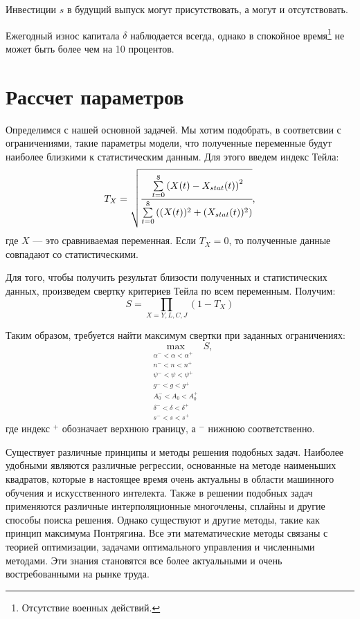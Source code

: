 Инвестиции $s$ в будущий выпуск могут присутствовать, а могут и отсутствовать.

Ежегодный износ капитала $\delta$ наблюдается всегда, однако в спокойное время\footnote{Отсутствие военных действий.} не может быть более чем на 10 процентов.

\section{Рассчет параметров}

Определимся с нашей основной задачей.
Мы хотим подобрать, в соответсвии с ограничениями, такие параметры модели, что полученные переменные будут наиболее близкими к статистическим данным.
Для этого введем индекс Тейла:
\begin{equation*}
	T_{X} = \sqrt{\cfrac{\sum\limits_{t = 0}^{8}\left(X(t) - X_{stat}(t)\right)^2}{\sum\limits_{t = 0}^{8}\left((X(t))^2 + (X_{stat}(t))^2\right)}}\text{,}
\end{equation*}
где $X$ --- это сравниваемая переменная.
Если $T_{X} = 0$, то полученные данные совпадают со статистическими.

Для того, чтобы получить результат близости полученных и статистических данных, произведем свертку критериев Тейла по всем переменным.
Получим:
\begin{equation*}
S=\prod\limits_{X=Y,L,C,J}\left(1 -T_{X}\right)
\end{equation*}

Таким образом, требуется найти максимум свертки при заданных ограничениях:
\begin{equation*}
\max_{\substack{\alpha^- < \alpha < \alpha^+ \\ n^- < n < n^+ \\ \psi^- < \psi < \psi^+ \\ g^- < g < g^+ \\ A_0^- < A_0 < A_0^+ \\ \delta^- < \delta < \delta^+\\ s^- < s < s^+}} S \text{,}
\end{equation*}
где индекс $^+$ обозначает верхнюю границу, а $^-$ нижнюю соответственно.

Существует различные принципы и методы решения подобных задач.
Наиболее удобными являются различные регрессии, основанные на методе наименьших квадратов, которые в настоящее время очень актуальны в области машинного обучения и искусственного интелекта.
Также в решении подобных задач применяются различные интерполяционные многочлены, сплайны и другие способы поиска решения.
Однако существуют и другие методы, такие как принцип максимума Понтрягина.
Все эти математические методы связаны с теорией оптимизации, задачами оптимального управления и численными методами.
Эти знания становятся все более актуальными и очень востребованными на рынке труда.

